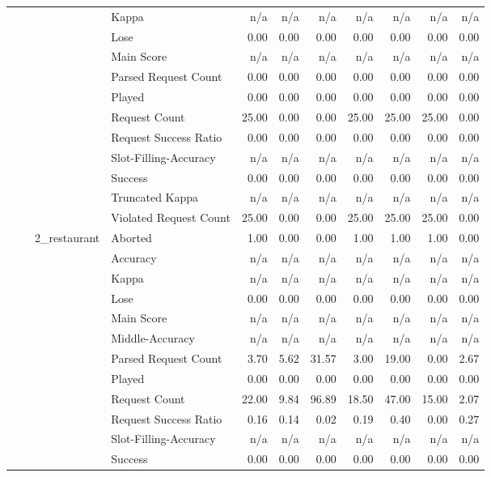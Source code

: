 \begin{tabular}{llllrrrrrrr}
 &  &  & Kappa & n/a & n/a & n/a & n/a & n/a & n/a & n/a \\
 &  &  & Lose & 0.00 & 0.00 & 0.00 & 0.00 & 0.00 & 0.00 & 0.00 \\
 &  &  & Main Score & n/a & n/a & n/a & n/a & n/a & n/a & n/a \\
 &  &  & Parsed Request Count & 0.00 & 0.00 & 0.00 & 0.00 & 0.00 & 0.00 & 0.00 \\
 &  &  & Played & 0.00 & 0.00 & 0.00 & 0.00 & 0.00 & 0.00 & 0.00 \\
 &  &  & Request Count & 25.00 & 0.00 & 0.00 & 25.00 & 25.00 & 25.00 & 0.00 \\
 &  &  & Request Success Ratio & 0.00 & 0.00 & 0.00 & 0.00 & 0.00 & 0.00 & 0.00 \\
 &  &  & Slot-Filling-Accuracy & n/a & n/a & n/a & n/a & n/a & n/a & n/a \\
 &  &  & Success & 0.00 & 0.00 & 0.00 & 0.00 & 0.00 & 0.00 & 0.00 \\
 &  &  & Truncated Kappa & n/a & n/a & n/a & n/a & n/a & n/a & n/a \\
 &  &  & Violated Request Count & 25.00 & 0.00 & 0.00 & 25.00 & 25.00 & 25.00 & 0.00 \\
\cline{3-11}
 &  & \multirow[t]{14}{*}{2_restaurant} & Aborted & 1.00 & 0.00 & 0.00 & 1.00 & 1.00 & 1.00 & 0.00 \\
 &  &  & Accuracy & n/a & n/a & n/a & n/a & n/a & n/a & n/a \\
 &  &  & Kappa & n/a & n/a & n/a & n/a & n/a & n/a & n/a \\
 &  &  & Lose & 0.00 & 0.00 & 0.00 & 0.00 & 0.00 & 0.00 & 0.00 \\
 &  &  & Main Score & n/a & n/a & n/a & n/a & n/a & n/a & n/a \\
 &  &  & Middle-Accuracy & n/a & n/a & n/a & n/a & n/a & n/a & n/a \\
 &  &  & Parsed Request Count & 3.70 & 5.62 & 31.57 & 3.00 & 19.00 & 0.00 & 2.67 \\
 &  &  & Played & 0.00 & 0.00 & 0.00 & 0.00 & 0.00 & 0.00 & 0.00 \\
 &  &  & Request Count & 22.00 & 9.84 & 96.89 & 18.50 & 47.00 & 15.00 & 2.07 \\
 &  &  & Request Success Ratio & 0.16 & 0.14 & 0.02 & 0.19 & 0.40 & 0.00 & 0.27 \\
 &  &  & Slot-Filling-Accuracy & n/a & n/a & n/a & n/a & n/a & n/a & n/a \\
 &  &  & Success & 0.00 & 0.00 & 0.00 & 0.00 & 0.00 & 0.00 & 0.00 \\

\end{tabular}
